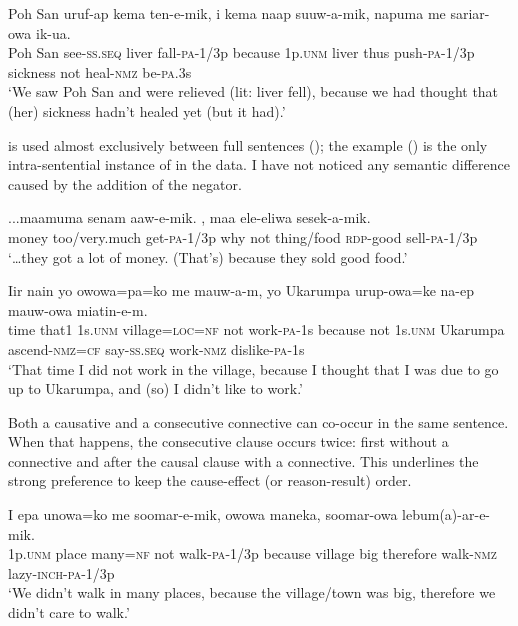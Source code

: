 \ea%
\label{ex:x1420}
\gll Poh  San  uruf-ap  kema  ten-e-mik,    i  kema naap  suuw-a-mik,  napuma  me  sariar-owa  ik-ua.\\
Poh  San  see-\textsc{ss}.\textsc{seq} liver fall-\textsc{pa}-1/3p  because 1p.\textsc{unm} liver thus  push-\textsc{pa}-1/3p sickness  not heal-\textsc{nmz} be-\textsc{pa}.3s\\
\glt`We saw Poh San and were relieved (lit: liver fell), because we had thought that (her) sickness hadn't healed yet (but it had).'
\z


 is used almost exclusively between full sentences (); the example () is the only intra-sentential instance of  in the data. I have not noticed any semantic difference caused by the addition of the negator.

\ea%
\label{ex:x1906}
\gll ...maamuma  senam  aaw-e-mik.    , maa  ele-eliwa  sesek-a-mik.\\
money  too/very.much  get-\textsc{pa}-1/3p why not thing/food  \textsc{rdp}-good sell-\textsc{pa}-1/3p\\
\glt`{\dots}they got a lot of money. (That's) because they sold good food.'
\z

 
\ea%
\label{ex:x1421}
\gll Iir  nain  yo  owowa=pa=ko  me  mauw-a-m,     yo  Ukarumpa  urup-owa=ke  na-ep mauw-owa  miatin-e-m.\\
time  that1  1s.\textsc{unm} village=\textsc{loc}=\textsc{nf} not  work-\textsc{pa}-1s because  not  1s.\textsc{unm} Ukarumpa  ascend-\textsc{nmz}=\textsc{cf} say-\textsc{ss}.\textsc{seq} work-\textsc{nmz} dislike-\textsc{pa}-1s\\
\glt`That time I did not work in the village, because I thought that I was due to go up to Ukarumpa, and (so) I didn't like to work.'
\z


Both a causative and a consecutive connective can co-occur in the same sentence. When that happens, the consecutive clause occurs twice: first without a connective and after the causal clause with a connective. This underlines the strong preference to keep the cause-effect (or reason-result) order.

\ea%
\label{ex:x1422}
\gll I  epa  unowa=ko  me  soomar-e-mik,    owowa maneka,    soomar-owa  lebum(a)-ar-e-mik.\\
1p.\textsc{unm} place  many=\textsc{nf} not  walk-\textsc{pa}-1/3p  because  village big  therefore  walk-\textsc{nmz} lazy-\textsc{inch}-\textsc{pa}-1/3p\\
\glt`We didn't walk in many places, because the village/town was big, therefore we didn't care to walk.'
\z


